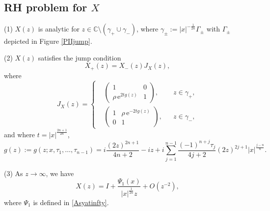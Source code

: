 \documentclass[11pt,a4paper]{article}
\numberwithin{equation}{section}
\begin{document}
\subsection*{RH problem for $X$}
\begin{description}
\item{(1)} $X(z)$ is analytic for $z\in\mathbb{C}\setminus(\gamma_+\cup\gamma_-)$, where $\gamma_{\pm}:=|x|^{-\frac{1}{2n}}\Gamma_{\pm}$ with $\Gamma_{\pm}$ depicted in Figure \ref{PIIjump}.
\item{(2)} $X(z)$ satisfies the jump condition
$$X_+(z)=X_-(z)J_{X}(z),$$
where
\begin{equation}
J_{X}(z)=\left\{\begin{aligned}
&\begin{pmatrix} 1 & 0 \\ \rho\,\mathrm{e}^{2tg(z)} & 1\end{pmatrix}, && z\in\gamma_+,\\
&\begin{pmatrix} 1 & \rho\,\mathrm{e}^{-2tg(z)} \\ 0 & 1\end{pmatrix}, &&
z\in\gamma_-,
\end{aligned}\right.
\end{equation}
and where $t=|x|^{\frac{2n+1}{2n}}$,
\begin{equation}\label{g-expression}
g(z):=g(z;x,\tau_1,\ldots,\tau_{n-1})
=i\frac{(2z)^{2n+1}}{4n+2}-iz+i\sum_{j=1}^{n-1}\frac{(-1)^{n+j} \tau_j}{4j+2}(2z)^{2 j+1}|x|^{\frac{j-n}{n}}.
\end{equation}
\item{(3)} As $z\to\infty$, we have
\begin{equation}
X(z)=I+\frac{\Psi_{1}(x)}{|x|^{\frac{1}{2n}}z}
+O\left(z^{-2}\right),
\end{equation}
where $\Psi_1$ is defined in \eqref{Asyatinfty}.
\end{description}
\end{document}
